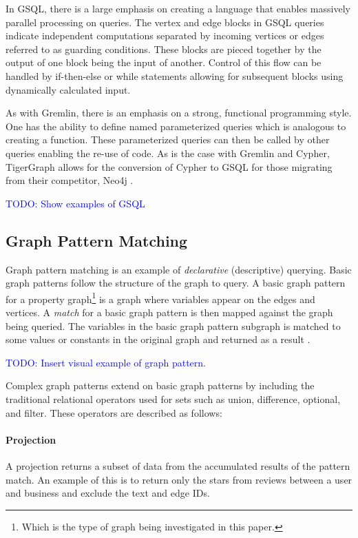 In GSQL, there is a large emphasis on creating a language that enables massively parallel processing on queries. The vertex and edge blocks in GSQL queries indicate independent computations separated by incoming vertices or edges referred to as guarding conditions. These blocks are pieced together by the output of one block being the input of another. Control of this flow can be handled by if-then-else or while statements allowing for subsequent blocks using dynamically calculated input.

As with Gremlin, there is an emphasis on a strong, functional programming style. One has the ability to define named parameterized queries which is analogous to creating a function. These parameterized queries can then be called by other queries enabling the re-use of code. As is the case with Gremlin and Cypher, TigerGraph allows for the conversion of Cypher to GSQL for those migrating from their competitor, Neo4j \cite{tigergraph-infoworld}.

\textcolor{blue}{TODO: Show examples of GSQL}

\subsection{Graph Pattern Matching}

Graph pattern matching is an example of \emph{declarative} (descriptive) querying. Basic graph patterns follow the structure of the graph to query. A basic graph pattern for a property graph\footnote{Which is the type of graph being investigated in this paper.} is a graph where variables appear on the edges and vertices. A \emph{match} for a basic graph pattern is then mapped against the graph being queried. The variables in the basic graph pattern subgraph is matched to some values or constants in the original graph and returned as a result \cite{foundations-of-modern-gql}.

\textcolor{blue}{ TODO: Insert visual example of graph pattern.}

Complex graph patterns extend on basic graph patterns by including the traditional relational operators used for sets such as union, difference, optional, and filter. These operators are described as follows:

\paragraph{Projection} A projection returns a subset of data from the accumulated results of the pattern match. An example of this is to return only the stars from reviews between a user and business and exclude the text and edge IDs.


